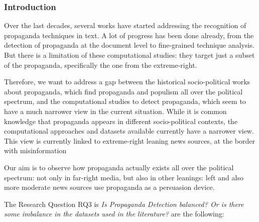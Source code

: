 \subsubsection{Introduction}

Over the last decades, several works have started addressing the recognition of propaganda techniques in text. A lot of progress has been done already, from the detection of propaganda at the document level to fine-grained technique analysis. But there is a limitation of these computational studies: they target just a subset of the propaganda, specifically the one from the extreme-right. %





Therefore, we want to address a gap between the historical socio-political works about propaganda, which find propaganda and populism all over the political spectrum, and the computational studies to detect propaganda, which seem to have a much narrower view in the current situation.
While it is common knowledge that propaganda appears in different socio-political contexts, the computational approaches and datasets available currently have a narrower view.
This view is currently linked to extreme-right leaning news sources, at the border with misinformation


Our aim is to observe how propaganda actually exists all over the political spectrum: not only in far-right media, but also in other leanings: left and also more moderate news sources use propaganda as a persuasion device.

The Research Question RQ3 is \emph{Is Propaganda Detection balanced? Or is there some imbalance in the datasets used in the literature?}
are the following:

